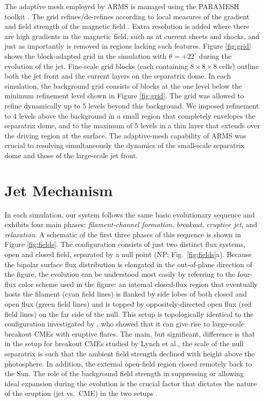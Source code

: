 \documentclass[twocolumn]{aastex6}
\begin{document}
The adaptive mesh employed by ARMS is managed using the PARAMESH toolkit \citep{MacNeice2000}. The grid refines/de-refines according to local measures of the gradient and field strength of the magnetic field \citep[see the appendix of][]{Karpen2012}. Extra resolution is added where there are high gradients in the magnetic field, such as at current sheets and shocks, and just as importantly is removed in regions lacking such features. Figure \ref{fig:grid} shows the block-adapted grid in the simulation with $\theta = +22^\circ$ during the evolution of the jet. Fine-scale grid blocks (each containing $8\times8\times8$ cells) outline both the jet front and the current layers on the separatrix dome. In each simulation, the background grid consists of blocks at the one level below the minimum refinement level shown in Figure \ref{fig:grid}. The grid was allowed to refine dynamically up to $5$ levels beyond this background. We imposed refinement to $4$ levels above the background in a small region that completely envelopes the separatrix dome, and to the maximum of $5$ levels in a thin layer that extends over the driving region at the surface. The adaptive-mesh capability of ARMS was crucial to resolving simultaneously the dynamics of the small-scale separatrix dome and those of the large-scale jet front.

\section{Jet Mechanism}
\label{sec:mechanism}
In each simulation, our system follows the same basic evolutionary sequence and exhibits four main phases: \textit{filament-channel formation}, \textit{breakout}, \textit{eruptive jet}, and \textit{relaxation}. A schematic of the first three phases of this sequence is shown in Figure \ref{fig:fields}. The configuration consists of just two distinct flux systems, open and closed field, separated by a null point (NP; Fig.\ \ref{fig:fields}a). Because the bipolar surface flux distribution is elongated in the out-of-plane direction of the figure, the evolution can be understood most easily by referring to the four-flux color scheme used in the figure: an internal closed-flux region that eventually hosts the filament (cyan field lines) is flanked by side lobes of both closed and open flux (green field lines) and is topped by oppositely-directed open flux (red field lines) on the far side of the null. This setup is topologically identical to the configuration investigated by \citet{Lynch2008}, who showed that it can give rise to large-scale breakout CMEs with eruptive flares. The main, but significant, difference is that in the setup for breakout CMEs studied by Lynch et al., the scale of the null separatrix is such that the ambient field strength declined with height above the photosphere. In addition, the external open-field region closed remotely back to the Sun. The role of the background field strength in suppressing or allowing ideal expansion during the evolution is the crucial factor that dictates the nature of the eruption (jet vs.\ CME) in the two setups \citep{Wyper2017}.
\end{document}
